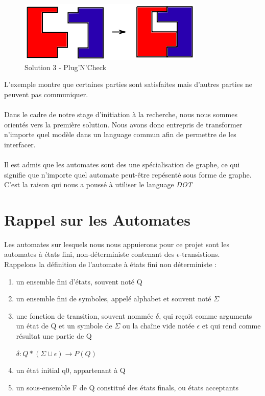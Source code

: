 \documentclass[12pt,a4paper]{report}
\begin{document}
\begin{figure}[h]
	\centering
	\includegraphics[scale=1]{ressources/solution3.png}
	\caption{Solution 3 - Plug'N'Check}
\end{figure}

L'exemple montre que certaines parties sont satisfaites mais d'autres parties ne 
peuvent pas communiquer.
\\\\
Dans le cadre de notre stage d'initiation à la recherche, nous nous sommes 
orientés vers la première solution. Nous avons donc entrepris de transformer 
n'importe quel modèle dans un language commun afin de permettre de les 
interfacer.
\\\\
Il est admis que les automates sont des une spécialisation de graphe, ce qui 
signifie que n'importe quel automate peut-être repésenté sous forme de graphe. 
C'est la raison qui nous a poussé à utiliser le language \emph{DOT} 
\newpage
\section{Rappel sur les Automates}

    Les automates sur lesquels nous nous appuierons pour ce projet sont les automates à états fini, non-déterministe contenant des $\epsilon$-transistions.\\
    
    Rappelons la définition de l’automate à états fini non déterministe :
\begin{enumerate}
    \item un ensemble fini d’états, souvent noté Q 
    \item un ensemble fini de symboles, appelé alphabet et souvent noté $\Sigma$ 
    \item une fonction de transition, souvent nommée $\delta$, qui reçoit comme arguments un état de Q et un symbole de $\Sigma$ ou la chaîne vide notée $\epsilon$ et qui rend comme résultat une partie de Q \begin{center}$\delta : Q * ( \Sigma \cup \epsilon ) \rightarrow P(Q)$ \end{center}
    \item un état initial q0, appartenant à Q
    \item un sous-ensemble F de Q constitué des états finals, ou états acceptants\\
\end{enumerate}    
\end{document}
